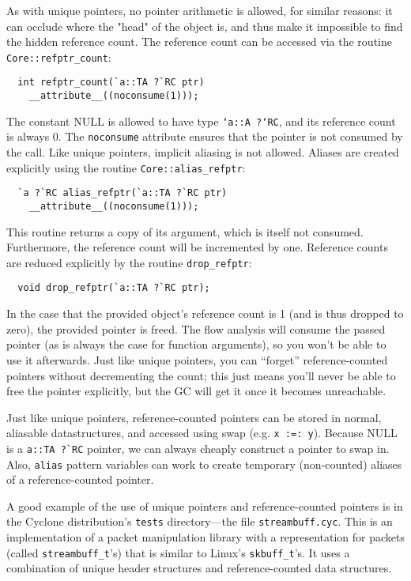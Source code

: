 As with unique pointers, no pointer arithmetic is allowed, for similar
reasons: it can occlude where the "head" of the object is, and thus make
it impossible to find the hidden reference count.  The reference count
can be accessed via the routine \texttt{Core::refptr_count}:
\begin{verbatim}
  int refptr_count(`a::TA ?`RC ptr)
    __attribute__((noconsume(1)));
\end{verbatim} %
The constant NULL is allowed to have type \texttt{`a::A ?`RC}, and its
reference count is always 0.  The \texttt{noconsume} attribute ensures that
the pointer is not consumed by the call.  Like unique pointers, implicit
aliasing is not allowed.  Aliases are created explicitly using the routine
\texttt{Core::alias_refptr}:
\begin{verbatim}
  `a ?`RC alias_refptr(`a::TA ?`RC ptr)
    __attribute__((noconsume(1)));
\end{verbatim} %
This routine returns a copy of its argument, which is itself not consumed.
Furthermore, the reference count will be incremented by one.  Reference
counts are reduced explicitly by the routine \texttt{drop_refptr}:
\begin{verbatim}
  void drop_refptr(`a::TA ?`RC ptr);
\end{verbatim}
In the case that the provided object's reference count is 1 (and is thus
dropped to zero), the provided pointer is freed.  The flow analysis will
consume the passed pointer (as is always the case for function arguments),
so you won't be able to use it afterwards.  Just like unique pointers, you
can ``forget'' reference-counted pointers without decrementing the count;
this just means you'll never be able to free the pointer explicitly, but the
GC will get it once it becomes unreachable.

Just like unique pointers, reference-counted pointers can be stored in
normal, aliasable datastructures, and accessed using swap (e.g. \texttt{x
:=: y}).  Because NULL is a \verb+a::TA ?`RC+ pointer, we can always
cheaply construct a pointer to swap in.  Also, \texttt{alias} pattern
variables can work to create temporary (non-counted) aliases of a
reference-counted pointer.

A good example of the use of unique pointers and reference-counted pointers
is in the Cyclone distribution's \texttt{tests} directory---the file
\texttt{streambuff.cyc}.  This is an implementation of a packet manipulation
library with a representation for packets (called \texttt{streambuff\_t}'s)
that is similar to Linux's \texttt{skbuff\_t}'s.  It uses a combination of
unique header structures and reference-counted data structures.

